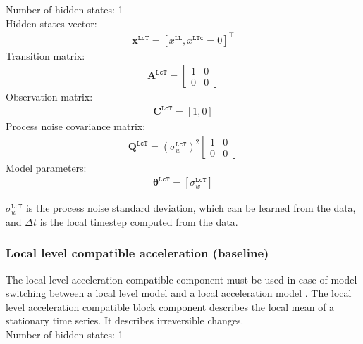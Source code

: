 \noindent
Number of hidden states: 1\\

Hidden states vector: 
\begin{gather*}
 \mathbf{x}^{\mathtt{LcT}} = [x^{\mathtt{LL}}, x^{\mathtt{LTc}}=0]^{\intercal}
 \end{gather*}
Transition matrix: 
\begin{gather*}
\mathbf{A}^{\mathtt{LcT}}= \left[\begin{array}{cc}1 & 0\\0&0\end{array}\right]
\end{gather*}
Observation matrix: 
\begin{gather*}
\mathbf{C}^{\mathtt{LcT}}=[1, 0]
\end{gather*}
Process noise covariance matrix: 
\begin{gather*}
\mathbf{Q}^{\mathtt{LcT}}=(\sigma_{w}^{\mathtt{LcT}})^{2}\left[\begin{array}{cc}1 &0\\0&0\end{array}\right]
\end{gather*}
Model parameters: 
\begin{gather*}
\bm\theta^{\mathtt{LcT}}=[\sigma_{w}^{\mathtt{LcT}} ]
\end{gather*}

\noindent
$\sigma_{w}^{\mathtt{LcT}}$ is the process noise standard deviation, which can be learned from the data, and $\Delta t$ is the local timestep computed from the data.

\subsubsection{Local level compatible acceleration (baseline)}

The local level acceleration compatible component must be used in case of model switching between a local level model and a local acceleration model \cite{Nguyen2018}.
The local level acceleration compatible block component describes the local mean of a stationary time series.
It describes irreversible changes.\\

\noindent
Number of hidden states: 1\\

